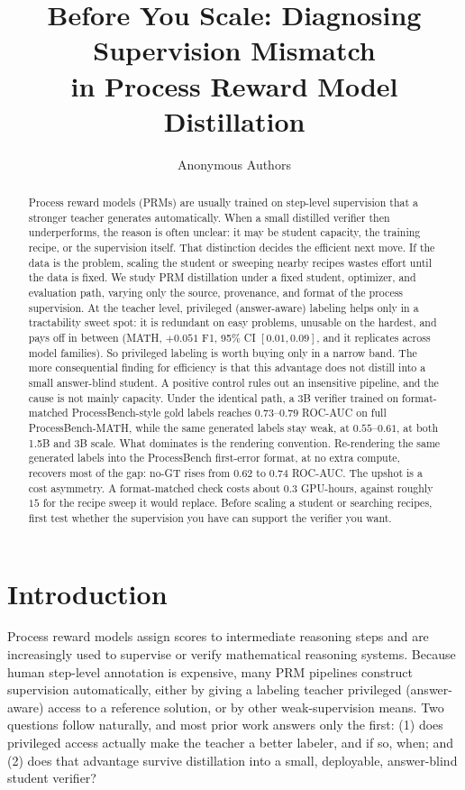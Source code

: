 \documentclass{article}
\title{Before You Scale: Diagnosing Supervision Mismatch\\
in Process Reward Model Distillation}
\author{Anonymous Authors}
\date{}
\begin{document}
\maketitle

\begin{abstract}
Process reward models (PRMs) are usually trained on step-level supervision
that a stronger teacher generates automatically. When a small distilled
verifier then underperforms, the reason is often unclear: it may be student
capacity, the training recipe, or the supervision itself. That distinction
decides the efficient next move. If the data is the problem, scaling the
student or sweeping nearby recipes wastes effort until the data is fixed. We
study PRM distillation under a fixed student, optimizer, and evaluation path,
varying only the source, provenance, and format of the process supervision.
At the teacher level, privileged (answer-aware) labeling helps only in a
tractability sweet spot: it is redundant on easy problems, unusable on the
hardest, and pays off in between (MATH, $+0.051$ F1, 95\% CI $[0.01, 0.09]$,
and it replicates across model families). So privileged labeling is worth
buying only in a narrow band. The more consequential finding for efficiency is
that this advantage does not distill into a small answer-blind student. A
positive control rules out an insensitive pipeline, and the cause is not
mainly capacity. Under the identical path, a 3B verifier trained on
format-matched ProcessBench-style gold labels reaches $0.73$--$0.79$ ROC-AUC
on full ProcessBench-MATH, while the same generated labels stay weak, at
$0.55$--$0.61$, at both 1.5B and 3B scale. What dominates is the rendering
convention. Re-rendering the same generated labels into the ProcessBench
first-error format, at no extra compute, recovers most of the gap: no-GT rises
from $0.62$ to $0.74$ ROC-AUC. The upshot is a cost asymmetry. A format-matched
check costs about $0.3$ GPU-hours, against roughly $15$ for the recipe sweep it
would replace. Before scaling a student or searching recipes, first test
whether the supervision you have can support the verifier you want.
\end{abstract}

\section{Introduction}
\label{sec:intro}

Process reward models assign scores to intermediate reasoning steps and are
increasingly used to supervise or verify mathematical reasoning systems.
Because human step-level annotation is expensive, many PRM pipelines
construct supervision automatically, either by giving a labeling teacher
privileged (answer-aware) access to a reference solution, or by other
weak-supervision means. Two questions follow naturally, and most prior work
answers only the first: (1) does privileged access actually make the teacher
a better labeler, and if so, when; and (2) does that advantage survive
distillation into a small, deployable, answer-blind student verifier?
\end{document}
